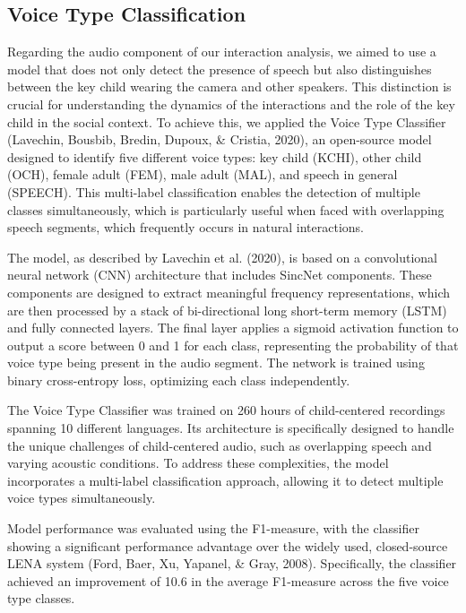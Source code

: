 \documentclass[
  man,floatsintext]{apa6}
\begin{document}
\subsection{Voice Type Classification}\label{sup-voice-type}

Regarding the audio component of our interaction analysis, we aimed to use a model that does not only detect the presence of speech but also distinguishes between the key child wearing the camera and other speakers. This distinction is crucial for understanding the dynamics of the interactions and the role of the key child in the social context. To achieve this, we applied the Voice Type Classifier (Lavechin, Bousbib, Bredin, Dupoux, \& Cristia, 2020), an open-source model designed to identify five different voice types: key child (KCHI), other child (OCH), female adult (FEM), male adult (MAL), and speech in general (SPEECH). This multi-label classification enables the detection of multiple classes simultaneously, which is particularly useful when faced with overlapping speech segments, which frequently occurs in natural interactions.

The model, as described by Lavechin et al. (2020), is based on a convolutional neural network (CNN) architecture that includes SincNet components. These components are designed to extract meaningful frequency representations, which are then processed by a stack of bi-directional long short-term memory (LSTM) and fully connected layers. The final layer applies a sigmoid activation function to output a score between 0 and 1 for each class, representing the probability of that voice type being present in the audio segment. The network is trained using binary cross-entropy loss, optimizing each class independently.

The Voice Type Classifier was trained on 260 hours of child-centered recordings spanning 10 different languages. Its architecture is specifically designed to handle the unique challenges of child-centered audio, such as overlapping speech and varying acoustic conditions. To address these complexities, the model incorporates a multi-label classification approach, allowing it to detect multiple voice types simultaneously.

Model performance was evaluated using the F1-measure, with the classifier showing a significant performance advantage over the widely used, closed-source LENA system (Ford, Baer, Xu, Yapanel, \& Gray, 2008). Specifically, the classifier achieved an improvement of 10.6 in the average F1-measure across the five voice type classes.
\end{document}
